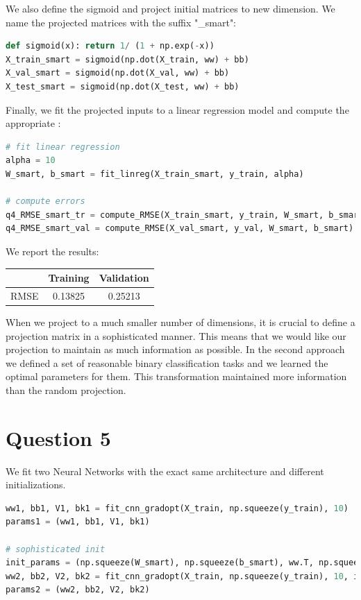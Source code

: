 \documentclass{article}
\begin{document}
We also define the sigmoid and project initial matrices to new dimension. We name the projected matrices with the suffix "\_smart":

\begin{lstlisting}[language=Python]
def sigmoid(x): return 1/ (1 + np.exp(-x))
X_train_smart = sigmoid(np.dot(X_train, ww) + bb)
X_val_smart = sigmoid(np.dot(X_val, ww) + bb)
X_test_smart = sigmoid(np.dot(X_test, ww) + bb)
\end{lstlisting}

Finally, we fit the projected inputs to a linear regression model and compute the appropriate :

\begin{lstlisting}[language=Python]
# fit linear regression
alpha = 10
W_smart, b_smart = fit_linreg(X_train_smart, y_train, alpha)

# compute errors
q4_RMSE_smart_tr = compute_RMSE(X_train_smart, y_train, W_smart, b_smart)
q4_RMSE_smart_val = compute_RMSE(X_val_smart, y_val, W_smart, b_smart)
\end{lstlisting}

We report the results:

\begin{center}
\begin{tabular}{ | c | c | c | }
\hline
 & Training & Validation \\
\hline
RMSE & 0.13825 & 0.25213 \\ 
\hline
\end{tabular}
\end{center}

When we project to a much smaller number of dimensions, it is crucial to define a projection matrix in a sophisticated manner. This means that we would like our projection to maintain as much information as possible. In the second approach we defined a set of reasonable binary classification tasks and we learned the optimal parameters for them. This transformation maintained more information than the random projection.  

\section*{Question 5}

We fit two Neural Networks with the exact same architecture and different initializations.

\begin{lstlisting}[language=Python]
ww1, bb1, V1, bk1 = fit_cnn_gradopt(X_train, np.squeeze(y_train), 10)
params1 = (ww1, bb1, V1, bk1)

# sophisticated init
init_params = (np.squeeze(W_smart), np.squeeze(b_smart), ww.T, np.squeeze(bb))
ww2, bb2, V2, bk2 = fit_cnn_gradopt(X_train, np.squeeze(y_train), 10, init_params)
params2 = (ww2, bb2, V2, bk2)
\end{lstlisting}
\end{document}
